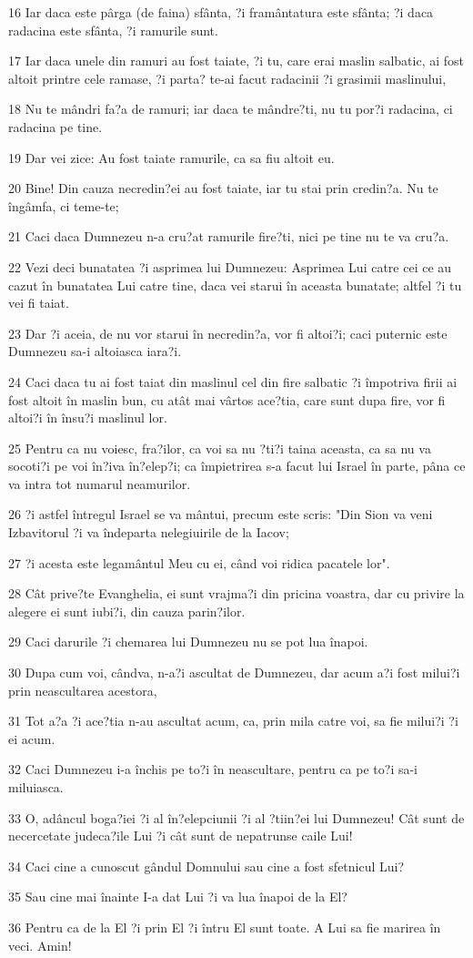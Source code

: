 \par 16 Iar daca este pârga (de faina) sfânta, ?i framântatura este sfânta; ?i daca radacina este sfânta, ?i ramurile sunt.
\par 17 Iar daca unele din ramuri au fost taiate, ?i tu, care erai maslin salbatic, ai fost altoit printre cele ramase, ?i parta? te-ai facut radacinii ?i grasimii maslinului,
\par 18 Nu te mândri fa?a de ramuri; iar daca te mândre?ti, nu tu por?i radacina, ci radacina pe tine.
\par 19 Dar vei zice: Au fost taiate ramurile, ca sa fiu altoit eu.
\par 20 Bine! Din cauza necredin?ei au fost taiate, iar tu stai prin credin?a. Nu te îngâmfa, ci teme-te;
\par 21 Caci daca Dumnezeu n-a cru?at ramurile fire?ti, nici pe tine nu te va cru?a.
\par 22 Vezi deci bunatatea ?i asprimea lui Dumnezeu: Asprimea Lui catre cei ce au cazut în bunatatea Lui catre tine, daca vei starui în aceasta bunatate; altfel ?i tu vei fi taiat.
\par 23 Dar ?i aceia, de nu vor starui în necredin?a, vor fi altoi?i; caci puternic este Dumnezeu sa-i altoiasca iara?i.
\par 24 Caci daca tu ai fost taiat din maslinul cel din fire salbatic ?i împotriva firii ai fost altoit în maslin bun, cu atât mai vârtos ace?tia, care sunt dupa fire, vor fi altoi?i în însu?i maslinul lor.
\par 25 Pentru ca nu voiesc, fra?ilor, ca voi sa nu ?ti?i taina aceasta, ca sa nu va socoti?i pe voi în?iva în?elep?i; ca împietrirea s-a facut lui Israel în parte, pâna ce va intra tot numarul neamurilor.
\par 26 ?i astfel întregul Israel se va mântui, precum este scris: "Din Sion va veni Izbavitorul ?i va îndeparta nelegiuirile de la Iacov;
\par 27 ?i acesta este legamântul Meu cu ei, când voi ridica pacatele lor".
\par 28 Cât prive?te Evanghelia, ei sunt vrajma?i din pricina voastra, dar cu privire la alegere ei sunt iubi?i, din cauza parin?ilor.
\par 29 Caci darurile ?i chemarea lui Dumnezeu nu se pot lua înapoi.
\par 30 Dupa cum voi, cândva, n-a?i ascultat de Dumnezeu, dar acum a?i fost milui?i prin neascultarea acestora,
\par 31 Tot a?a ?i ace?tia n-au ascultat acum, ca, prin mila catre voi, sa fie milui?i ?i ei acum.
\par 32 Caci Dumnezeu i-a închis pe to?i în neascultare, pentru ca pe to?i sa-i miluiasca.
\par 33 O, adâncul boga?iei ?i al în?elepciunii ?i al ?tiin?ei lui Dumnezeu! Cât sunt de necercetate judeca?ile Lui ?i cât sunt de nepatrunse caile Lui!
\par 34 Caci cine a cunoscut gândul Domnului sau cine a fost sfetnicul Lui?
\par 35 Sau cine mai înainte I-a dat Lui ?i va lua înapoi de la El?
\par 36 Pentru ca de la El ?i prin El ?i întru El sunt toate. A Lui sa fie marirea în veci. Amin!

